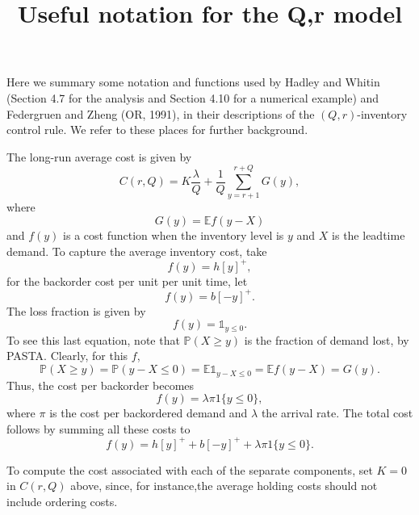 \documentclass{article}
\title{Useful notation for the Q,r model}
\newcommand{\E}{\mathbb{E}}
\newcommand{\1}[1]{\mathbb{1}_{#1}}
\renewcommand{\P}{\mathbb{P}}
\begin{document}
\maketitle

Here we summary some notation and functions used by Hadley and Whitin
(Section 4.7 for the analysis and Section 4.10 for a numerical
example) and Federgruen and Zheng (OR, 1991), in their descriptions of
the $(Q,r)$-inventory control rule. We refer to these places for
further background.

The long-run average cost is given by
\begin{equation*}
  C(r, Q) = K \frac{\lambda}{Q} + \frac1Q \sum_{y=r+1}^{r+Q} G(y),
\end{equation*}
where
\begin{equation*}
  G(y) = \E f(y-X)
\end{equation*}
and $f(y)$ is a cost function when the inventory level is $y$ and $X$
is the leadtime demand. To capture the average inventory cost, take
\begin{equation*}
   f(y) = h [y]^+,
\end{equation*}
for the backorder cost per unit per unit time, let
\begin{equation*}
   f(y) = b [-y]^+.
\end{equation*}
The loss fraction is given by
\begin{equation*}
   f(y) = \1{y\leq 0}.
\end{equation*}
To see this last equation, note that $\P(X\geq y)$ is the
fraction of demand lost, by PASTA. Clearly, for this $f$,
\begin{equation*}
\P(X\geq y) = \P(y-X \leq 0) = \E \1{y-X\leq 0} = \E f(y-X) = G(y).
\end{equation*}
Thus,  the cost per backorder becomes
\begin{equation*}
   f(y) = \lambda \pi 1\{y\leq 0\},
\end{equation*}
where $\pi$ is the cost per backordered demand and $\lambda$ the
arrival rate. The total cost follows by summing all these costs to
\begin{equation*}
   f(y) = h [y]^+ + b[-y]^+ + \lambda \pi 1\{y\leq 0\}.
\end{equation*}


To compute the cost associated with each of the separate components,
set $K=0$ in $C(r,Q)$ above, since, for instance,the average holding
costs should not include ordering costs.
\end{document}
